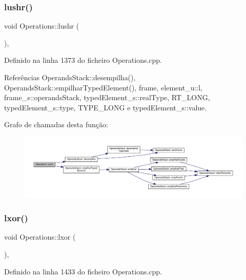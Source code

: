 \subsubsection{\texorpdfstring{lushr()}{lushr()}}
{\footnotesize\ttfamily void Operations\+::lushr (\begin{DoxyParamCaption}{ }\end{DoxyParamCaption})\hspace{0.3cm}{\ttfamily [static]}, {\ttfamily [private]}}



Definido na linha 1373 do ficheiro Operations.\+cpp.



Referências Operands\+Stack\+::desempilha(), Operands\+Stack\+::empilhar\+Typed\+Element(), frame, element\+\_\+u\+::l, frame\+\_\+s\+::operands\+Stack, typed\+Element\+\_\+s\+::real\+Type, R\+T\+\_\+\+L\+O\+NG, typed\+Element\+\_\+s\+::type, T\+Y\+P\+E\+\_\+\+L\+O\+NG e typed\+Element\+\_\+s\+::value.

Grafo de chamadas desta função\+:
\nopagebreak
\begin{figure}[H]
\begin{center}
\leavevmode
\includegraphics[width=350pt]{classOperations_a3b7c61f8bca7b3ad0dacae6649aee042_cgraph}
\end{center}
\end{figure}
\mbox{\label{classOperations_ac135e723f1ac6a27c736e6b8e7d06a45}} 
\subsubsection{\texorpdfstring{lxor()}{lxor()}}
{\footnotesize\ttfamily void Operations\+::lxor (\begin{DoxyParamCaption}{ }\end{DoxyParamCaption})\hspace{0.3cm}{\ttfamily [static]}, {\ttfamily [private]}}



Definido na linha 1433 do ficheiro Operations.\+cpp.



